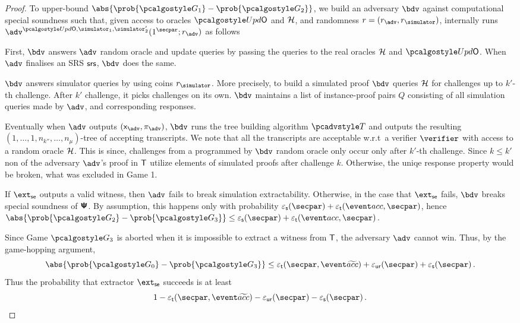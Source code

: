 \begin{proof}
 	To upper-bound $\abs{\prob{\game{1}} - \prob{\game{2}}}$, we build an adversary $\bdv$ against computational special soundness such that, given access to oracles $\initU$ and $\mathcal{H}$, and randomness $r = (r_\adv, \rsim)$, internally runs $\advse^{\initU, \simulator_1, \simulator_2'} (1^\secpar; r_\adv)$ as follows%
		\item
		First, $\bdv$ answers $\adv$ random oracle and update queries by passing the queries to the real
		oracles $\mathcal{H}$ and $\initU$. When $\adv$ finalises an SRS $\mathsf{srs}$, $\bdv$ does the same.
		
		$\bdv$ answers simulator queries by using coins $\rsim$. More precisely, to build a simulated proof $\bdv$ queries $\mathcal{H}$ for challenges up to $k'$-th challenge. After $k'$ challenge, it picks challenges on its own. $\bdv$ maintains a
		list of instance-proof pairs $Q$ consisting of all simulation queries made by
		$\adv$, and corresponding responses.
		
		Eventually when $\adv$ outputs $(\inp_\advse, \zkproof_\advse)$, $\bdv$ runs the tree building algorithm $\tdv$ and outputs the resulting $(1, \ldots, 1, n_{k''}, \ldots, n_\mu)$-tree of accepting transcripts. We note that all the transcripts are acceptable w.r.t~a verifier $\verifier$ with access to a random oracle $\mathcal{H}$. This is since, challenges from a programmed by $\bdv$ random oracle only occur only after $k'$-th challenge. Since $k \leq k'$ non of the adversary $\adv$'s proof in $\mathsf{T}$ utilize elements of simulated proofs after challenge $k$. Otherwise, the uniqe response property would be broken, what was excluded in Game 1.
	
	If $\extse$ outputs a valid witness, then $\adv$ fails to break simulation extractability. Otherwise, in the case that $\extse$ fails, $\bdv$ breaks special soundness of $\bm{\mathsf{\Psi}}$. By assumption, this happens only with probability $\epss(\secpar) + \epst(\accProb, \secpar)$, hence $\abs{\prob{\game{2}} - \prob{\game{3}}} \leq \epss(\secpar) + \epst(\accProb, \secpar)$.
	
	 Since Game $\game{3}$ is aborted when it is impossible to
	extract a witness from $\mathsf{T}$,
	the adversary $\advse$ cannot win. Thus, by the game-hopping argument,
	\[
	\abs{\prob{\game{0}} - \prob{\game{3}}} \leq \epst(\secpar, \waccProb)
		 + \epsur(\secpar) + \epss(\secpar)\,.
	\]
	Thus the probability that extractor $\extse$ succeeds is at least
	\[
	1 - \epst(\secpar, \waccProb) - 
	\epsur(\secpar)
	- \epss(\secpar)\,.
	\]
	
	\end{proof}
	
